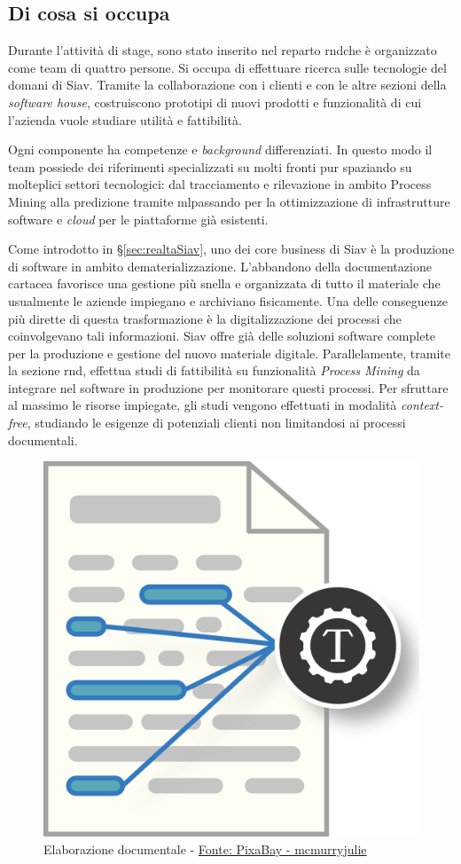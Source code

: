 \subsection{Di cosa si occupa}
Durante l'attività di stage, sono stato inserito nel reparto \acrshort{rnd}\glsfirstoccur che è organizzato come team di quattro persone. Si occupa di effettuare ricerca sulle tecnologie del domani di Siav. Tramite la collaborazione con i clienti e con le altre sezioni della \textit{software house}, costruiscono prototipi di nuovi prodotti e funzionalità di cui l'azienda vuole studiare utilità e fattibilità.

Ogni componente ha competenze e \textit{background} differenziati. In questo modo il team possiede dei riferimenti specializzati su molti fronti pur spaziando su molteplici settori tecnologici: dal tracciamento e rilevazione in ambito Process Mining alla predizione tramite \acrlong{ml}\glsfirstoccur passando per la ottimizzazione di infrastrutture software e \textit{cloud} per le piattaforme già esistenti.

Come introdotto in \S \ref{sec:realtaSiav}, uno dei core business di Siav è la produzione di software in ambito dematerializzazione. L'abbandono della documentazione cartacea favorisce una gestione più snella e organizzata di tutto il materiale che usualmente le aziende impiegano e archiviano fisicamente. Una delle conseguenze più dirette di questa trasformazione è la digitalizzazione dei processi che coinvolgevano tali informazioni. Siav offre già delle soluzioni software complete per la produzione e gestione del nuovo materiale digitale. Parallelamente, tramite la sezione \acrshort{rnd}, effettua studi di fattibilità su funzionalità \textit{Process Mining} da integrare nel software in produzione per monitorare questi processi. Per sfruttare al massimo le risorse impiegate, gli studi vengono effettuati in modalità \textit{context-free}, studiando le esigenze di potenziali clienti non limitandosi ai processi documentali.
\begin{figure}[H] 
    \centering 
    \includegraphics[width=0.45\columnwidth]{immagini/text-mining.png} 
    \caption{Elaborazione documentale - \href{https://pixabay.com/it/users/mcmurryjulie-2375405/?utm_source=link-attribution&amp;utm_medium=referral&amp;utm_campaign=image&amp;utm_content=1476780}{Fonte: PixaBay - mcmurryjulie}}
\end{figure}

